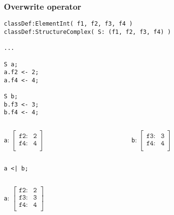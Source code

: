 \documentclass[11pt]{beamer}
\begin{document}
\begin{frame}[fragile]
\frametitle{Overwrite operator}
\scriptsize
\begin{lstlisting}[language=lekta]
classDef:ElementInt( f1, f2, f3, f4 )
classDef:StructureComplex( S: (f1, f2, f3, f4) )

...

S a;
a.f2 <- 2;
a.f4 <- 4;

S b;
b.f3 <- 3;
b.f4 <- 4;
\end{lstlisting}
\small
\vspace{-10pt}
\begin{columns}
	\begin{column}{0.5\textwidth}
		\begin{center}
			\texttt{a}: $\begin{bmatrix}
																				\texttt{f2:}      & \texttt{2}\\ 
																				\texttt{f4:}     	& \texttt{4}\\ 
																			\end{bmatrix}$
		\end{center}
	\end{column}
	\begin{column}{0.5\textwidth}
		\begin{center}
			\texttt{b}: $\begin{bmatrix}
																				\texttt{f3:}      & \texttt{3}\\ 
																				\texttt{f4:}     	& \texttt{4}\\ 
																			\end{bmatrix}$
		\end{center}
	\end{column}
\end{columns}
\begin{center}
\texttt{a <| b;}
\end{center}
\vspace{-30pt}
\begin{columns}
	\begin{column}{0.5\textwidth}
		\begin{center}
			\texttt{a}: $\begin{bmatrix}
																				\texttt{f2:}      & \texttt{2}\\ 
																				\texttt{f3:}      & \texttt{3}\\ 
																				\texttt{f4:}     	& \texttt{4}\\ 
																			\end{bmatrix}$

\end{center}
\end{column}
\end{columns}
\end{frame}
\end{document}
